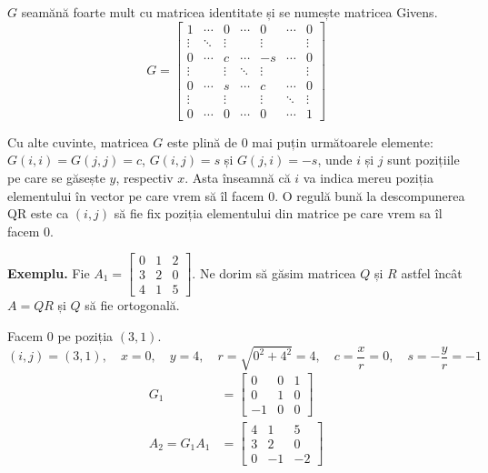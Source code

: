 \documentclass{exam}
\begin{document}
$G$ seamănă foarte mult cu matricea identitate și se numește matricea Givens.
\begin{equation*}
	G =
	\begin{bmatrix}   1      & \cdots & 0      & \cdots & 0      & \cdots & 0      \\
                  \vdots & \ddots & \vdots &        & \vdots &        & \vdots \\
                  0      & \cdots & c      & \cdots & -s     & \cdots & 0      \\
                  \vdots &        & \vdots & \ddots & \vdots &        & \vdots \\
                  0      & \cdots & s      & \cdots & c      & \cdots & 0      \\
                  \vdots &        & \vdots &        & \vdots & \ddots & \vdots \\
                  0      & \cdots & 0      & \cdots & 0      & \cdots & 1
	\end{bmatrix}
\end{equation*}

Cu alte cuvinte, matricea $G$ este plină de 0 mai puțin următoarele
elemente: $G(i, i) = G(j, j) = c$, $G(i, j) = s$ și $G(j, i) = -s$, unde $i$
și $j$ sunt pozițiile pe care se găsește $y$, respectiv $x$. Asta înseamnă că $i$
va indica mereu poziția elementului în vector pe care vrem să îl facem 0.
O regulă bună la descompunerea QR este ca $(i, j)$ să fie fix poziția
elementului din matrice pe care vrem sa îl facem 0.

\textbf{Exemplu.} Fie $A_1 = \begin{bmatrix}
		0 & 1 & 2 \\
		3 & 2 & 0 \\
		4 & 1 & 5
	\end{bmatrix}$. Ne dorim să găsim matricea $Q$ și $R$ astfel încât $A = QR$ și $Q$ să fie ortogonală.

Facem 0 pe poziția $(3, 1)$.
\begin{equation*}
	(i, j) = (3, 1), \quad x = 0, \quad y = 4, \quad r = \sqrt{0^2 + 4^2} = 4, \quad c = \frac{x}{r} = 0, \quad s = -\frac{y}{r} = -1
\end{equation*}
\begin{align*}
	G_1           & = \begin{bmatrix}
		                  0  & 0 & 1 \\
		                  0  & 1 & 0 \\
		                  -1 & 0 & 0
	                  \end{bmatrix} \\
	A_2 = G_1 A_1 & = \begin{bmatrix}
		                  4 & 1  & 5  \\
		                  3 & 2  & 0  \\
		                  0 & -1 & -2
	                  \end{bmatrix}
\end{align*}
\end{document}
